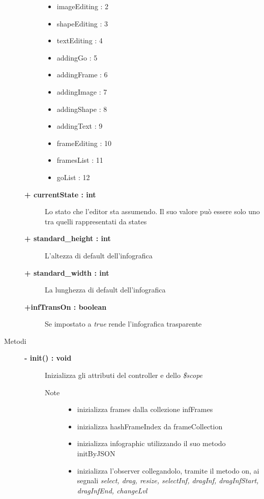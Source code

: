 \begin{description}
\begin{description}
\begin{itemize}
			\item imageEditing : 2
			\item shapeEditing : 3
			\item textEditing : 4
			\item addingGo : 5
			\item addingFrame : 6
			\item addingImage : 7
			\item addingShape : 8
			\item addingText : 9
			\item frameEditing : 10
			\item framesList : 11
			\item goList : 12
		\end{itemize}
		\item[\textbf{+ currentState : int			}] \hfill
			Lo stato che l'editor sta assumendo. Il suo valore può essere solo uno tra quelli rappresentati da states
		\item[\textbf{+ standard\_height : int			}] \hfill
			L'altezza di default dell'infografica
		\item[\textbf{+ standard\_width : int			}] \hfill
			La lunghezza di default dell'infografica
		\item[\textbf{+infTransOn : boolean			}] \hfill
			Se impostato a \textit{true} rende l'infografica trasparente 
	\end{description}
	
	
	
\item[Metodi] \hfill

	\begin{description}
		\item[\textbf{\color{blue}- init() : void			}] \hfill
			Inizializza gli attributi del controller e dello \textit{\$scope}
			
		\begin{description}
			\item[Note] \hfill
			\begin{itemize}
					\item inizializza frames dalla collezione infFrames
					\item inizializza hashFrameIndex da frameCollection
					\item inizializza infographic utilizzando il suo metodo initByJSON
					\item inizializza l'observer collegandolo, tramite il metodo on, ai segnali \textit{select, drag, resize, selectInf, dragInf, dragInfStart, dragInfEnd, changeLvl }
			\end{itemize}
		\end{description}
	\end{description}
	

\end{description}
